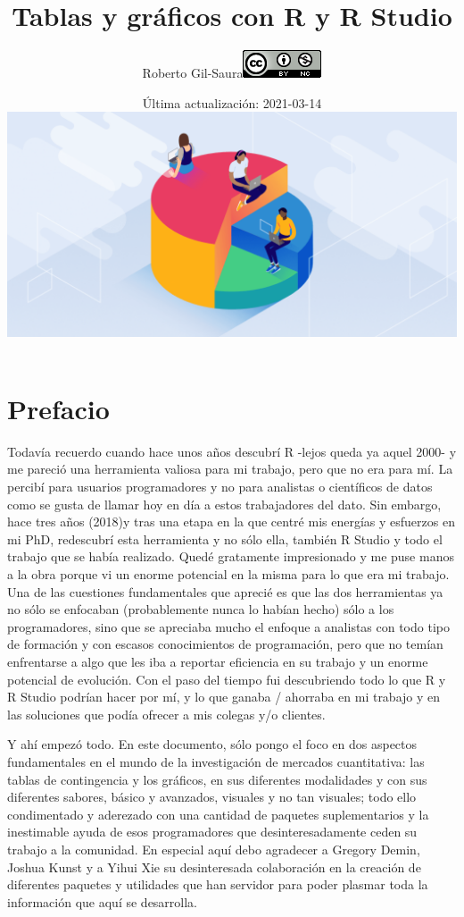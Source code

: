 \documentclass[
]{book}
\title{Tablas y gráficos con R y R Studio}
\author{Roberto Gil-Saura\includegraphics{data/88x31.png}}
\date{Última actualización: 2021-03-14\includegraphics{data/portada.png}}
\begin{document}
\maketitle

{
\setcounter{tocdepth}{1}
\tableofcontents
}
\hypertarget{prefacio}{%
\chapter*{Prefacio}\label{prefacio}}

Todavía recuerdo cuando hace unos años descubrí R \citep{R-base} -lejos queda ya aquel 2000- y me pareció una herramienta valiosa para mi trabajo, pero que no era para mí. La percibí para usuarios programadores y no para analistas o científicos de datos como se gusta de llamar hoy en día a estos trabajadores del dato. Sin embargo, hace tres años (2018)y tras una etapa en la que centré mis energías y esfuerzos en mi PhD, redescubrí esta herramienta y no sólo ella, también R Studio y todo el trabajo que se había realizado. Quedé gratamente impresionado y me puse manos a la obra porque vi un enorme potencial en la misma para lo que era mi trabajo. Una de las cuestiones fundamentales que aprecié es que las dos herramientas ya no sólo se enfocaban (probablemente nunca lo habían hecho) sólo a los programadores, sino que se apreciaba mucho el enfoque a analistas con todo tipo de formación y con escasos conocimientos de programación, pero que no temían enfrentarse a algo que les iba a reportar eficiencia en su trabajo y un enorme potencial de evolución. Con el paso del tiempo fui descubriendo todo lo que R y R Studio podrían hacer por mí, y lo que ganaba / ahorraba en mi trabajo y en las soluciones que podía ofrecer a mis colegas y/o clientes.

Y ahí empezó todo. En este documento, sólo pongo el foco en dos aspectos fundamentales en el mundo de la investigación de mercados cuantitativa: las tablas de contingencia y los gráficos, en sus diferentes modalidades y con sus diferentes sabores, básico y avanzados, visuales y no tan visuales; todo ello condimentado y aderezado con una cantidad de paquetes suplementarios y la inestimable ayuda de esos programadores que desinteresadamente ceden su trabajo a la comunidad. En especial aquí debo agradecer a Gregory Demin, Joshua Kunst y a Yihui Xie su desinteresada colaboración en la creación de diferentes paquetes y utilidades que han servidor para poder plasmar toda la información que aquí se desarrolla.
\end{document}
